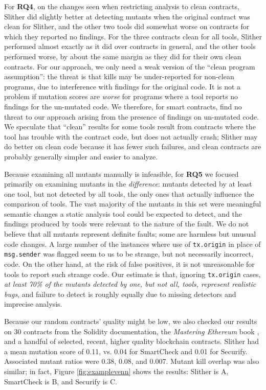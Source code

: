 For {\bf RQ4}, on the changes seen when restricting analysis to clean contracts, Slither did slightly better at detecting mutants when the original contract was clean for Slither, and the other two tools did somewhat worse on contracts for which they reported no findings.  For the three contracts clean for all tools, Slither performed almost exactly as it did over contracts in general, and the other tools performed worse, by about the same margin as they did for their own clean contracts.  For our approach, we only need a weak version of the ``clean program assumption'':  the threat is that kills may be under-reported for non-clean programs, due to interference with findings for the original code.  It is not a problem if mutation scores are \emph{worse} for programs where a tool reports no findings for the un-mutated code.  We therefore, for smart contracts, find no threat to our approach arising from the presence of findings on un-mutated code.  We speculate that ``clean'' results for some tools result from contracts where the tool has trouble with the contract code, but does not actually crash; Slither may do better on clean code because it has fewer such failures, and clean contracts are probably generally simpler and easier to analyze.

Because examining all mutants manually is infeasible,  for {\bf RQ5} we focused primarily on examining mutants in the \emph{difference}: mutants detected by at least one tool, but not detected by all tools, the only ones that actually influence the comparison of tools.  The vast majority of the mutants in this set were meaningful semantic changes a static analysis tool could be expected to detect, and the findings produced by tools were relevant to the nature of the fault.  We do not believe that all mutants represent definite faults; some are harmless but unusual code changes.  A large number of the instances where use of {\tt tx.origin} in place of {\tt msg.sender} was flagged seem to us to be strange, but not necessarily incorrect, code.  On the other hand, at the risk of false positives, it is not unreasonable for tools to report such strange code.   Our estimate is that, ignoring {\tt tx.origin} cases, \emph{at least 70\% of the mutants detected by one, but not all, tools, represent realistic bugs}, and failure to detect is roughly equally due to missing detectors and imprecise analysis.

Because our random contracts' quality might be low, we also checked our results on 30 contracts from the Solidity documentation, the \emph{Mastering Ethereum} book \cite{masteringEth}, and a handful of selected, recent, higher quality blockchain contracts.  Slither had a mean mutation score of 0.11, vs. 0.04 for SmartCheck and 0.01 for Securify.  Associated mutant ratios were 0.38, 0.08, and 0.007.  Mutant kill overlap was also similar; in fact, Figure \ref{fig:examplevenn} shows the results: Slither is A, SmartCheck is B, and Securify is C.

